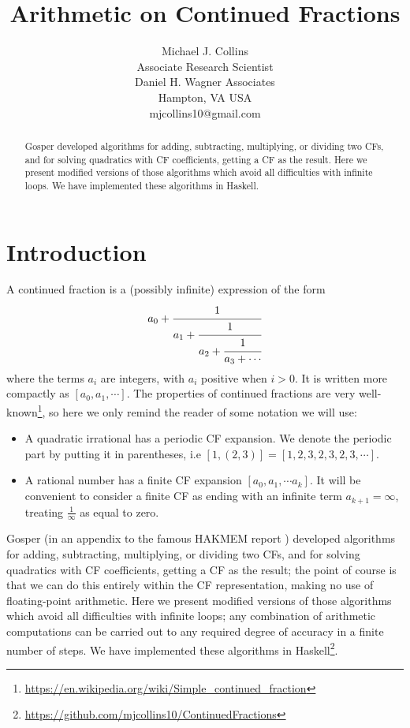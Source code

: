 \documentclass[11pt, oneside]{amsart}   	%
\title{Arithmetic on Continued Fractions}
\author{Michael J. Collins\\Associate Research Scientist\\Daniel H. Wagner Associates\\Hampton, VA USA\\mjcollins10@gmail.com}
\begin{document}
\begin{abstract}
Gosper  developed algorithms for adding, subtracting, multiplying, or dividing two CFs, and for solving quadratics with CF coefficients,
getting a CF as the result. Here we present modified versions of those algorithms which avoid all difficulties with infinite loops.
We have implemented these algorithms in Haskell.
\end{abstract}

\maketitle

\section{Introduction}
A continued fraction is a (possibly infinite) expression of the form
\begin{equation*}
a_0+\cfrac{1}{a_1+\cfrac{1}{a_2+\cfrac{1}{a_3+\cdots}}}
\end{equation*}
where the terms $a_i$ are integers, with $a_i$ positive when $i>0$. It is written more compactly as $[a_0, a_1, \cdots]$. The
properties of continued fractions are very well-known\footnote{\href{https://en.wikipedia.org/wiki/Simple\_continued\_fraction}{https://en.wikipedia.org/wiki/Simple\_continued\_fraction}},
so here we only remind the reader of some notation we will use:
\begin{itemize}
\item A quadratic irrational has a periodic CF expansion. We denote the periodic part by putting it in parentheses,
i.e $[1,(2,3)] = [1,2,3,2,3,2,3,\cdots]$.
\item A rational number has a finite CF expansion $[a_0,a_1, \cdots a_k]$.
It will be convenient to consider a finite CF as ending with an infinite term $a_{k+1}=\infty$, treating $\frac{1}{\infty}$ as equal to zero.
\end{itemize}
 
Gosper (in an appendix to the famous HAKMEM report \cite{hakmem}) 
developed algorithms for adding, subtracting, multiplying, or dividing two CFs, and for solving quadratics with CF coefficients, getting a CF as the result;
the point of course is that we can do this entirely within the CF representation, making no use of floating-point arithmetic. Here we
present modified versions of those algorithms which avoid all difficulties with infinite loops; any combination of arithmetic
computations can be carried out to any required degree of accuracy in a finite number of steps. We have implemented these algorithms
in Haskell\footnote{\href{https://github.com/mjcollins10/ContinuedFractions}{https://github.com/mjcollins10/ContinuedFractions}}.
\end{document}
